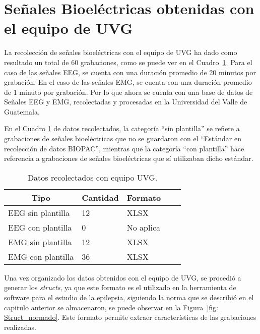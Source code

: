 \section{Señales Bioeléctricas obtenidas con el equipo de UVG}
La recolección de señales bioeléctricas con el equipo de UVG ha dado como resultado un total de 60 grabaciones, como se puede ver en el Cuadro~\ref{cuadro:tabla datos UVG}. Para el caso de las señales EEG, se cuenta con una duración promedio de 20 minutos por grabación. En el caso de las señales EMG, se cuenta con una duración promedio de 1 minuto por grabación. Por lo que ahora se cuenta con una base de datos de Señales EEG y EMG, recolectadas y procesadas en la Universidad del Valle de Guatemala.

En el Cuadro \ref{cuadro:tabla datos UVG} de datos recolectados, la categoría ``sin plantilla'' se refiere a grabaciones de señales bioeléctricas que no se guardaron con el ``Estándar en recolección de datos BIOPAC'', mientras que la categoría ``con plantilla'' hace referencia a grabaciones de señales bioeléctricas que sí utilizaban dicho estándar. 

\begin{table}[H]
\begin{center}
    \begin{tabular}{|l|l|l|l|l|}
    \hline
        \multicolumn{1}{|c|}{\textbf{Tipo}} & \multicolumn{1}{c|}{\textbf{Cantidad}} & \multicolumn{1}{c|}{\textbf{Formato}}\\ \hline
        EEG sin plantilla & 12  & XLSX \\ \hline
        EEG con plantilla & 0  & No aplica \\ \hline
        EMG sin plantilla & 12  & XLSX \\ \hline
        EMG con plantilla & 36  & XLSX \\ \hline
    \end{tabular}
    \caption[Datos en nube con equipo UVG]{Datos recolectados con equipo UVG.} 
    \label{cuadro:tabla datos UVG}
\end{center}
\end{table}

Una vez organizado los datos obtenidos con el equipo de UVG, se procedió a generar los \textit{structs}, ya que este formato es el utilizado en la herramienta de software para el estudio de la epilepsia, siguiendo la norma que se describió en el capitulo anterior se almacenaron, se puede observar en la Figura~\ref{fig: Struct_normado}. Este formato permite extraer características de las grabaciones realizadas.

